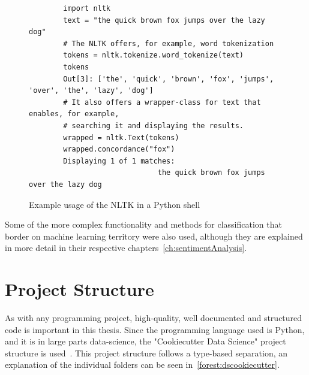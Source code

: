 \begin{figure}
    \caption{Example usage of the NLTK in a Python shell}
    \label{code:nltk}
    \begin{verbatim}
        import nltk
        text = "the quick brown fox jumps over the lazy dog"
        # The NLTK offers, for example, word tokenization
        tokens = nltk.tokenize.word_tokenize(text)
        tokens
        Out[3]: ['the', 'quick', 'brown', 'fox', 'jumps', 'over', 'the', 'lazy', 'dog']
        # It also offers a wrapper-class for text that enables, for example,
        # searching it and displaying the results.
        wrapped = nltk.Text(tokens)
        wrapped.concordance("fox")
        Displaying 1 of 1 matches:
                              the quick brown fox jumps over the lazy dog
    \end{verbatim}
\end{figure}

Some of the more complex functionality and methods for classification that border on machine learning territory were also used,
although they are explained in more detail in their respective chapters~\ref{ch:sentimentAnalysis}.

\section{Project Structure}
\label{sec:projectStructure}

As with any programming project, high-quality, well documented and structured code is important in this thesis.
Since the programming language used is Python, and it is in large parts data-science,
the "Cookiecutter Data Science" project structure is used~\cite{dsCookieCutter}.
This project structure follows a type-based separation, an explanation of the individual folders can be seen in~\ref{forest:dscookiecutter}.

